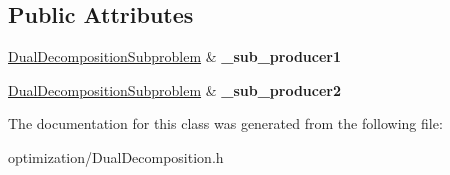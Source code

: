 \subsection*{Public Attributes}
\begin{DoxyCompactItemize}
\item 
\hypertarget{class_dual_decomposition_runner_a13371fbf1e5109e8a9d920d2ed0b7bea}{
\hyperlink{class_dual_decomposition_subproblem}{DualDecompositionSubproblem} \& {\bfseries \_\-sub\_\-producer1}}
\label{class_dual_decomposition_runner_a13371fbf1e5109e8a9d920d2ed0b7bea}

\item 
\hypertarget{class_dual_decomposition_runner_a988b68df84c131bc47d142ae8638fbd1}{
\hyperlink{class_dual_decomposition_subproblem}{DualDecompositionSubproblem} \& {\bfseries \_\-sub\_\-producer2}}
\label{class_dual_decomposition_runner_a988b68df84c131bc47d142ae8638fbd1}

\end{DoxyCompactItemize}


The documentation for this class was generated from the following file:\begin{DoxyCompactItemize}
\item 
optimization/DualDecomposition.h\end{DoxyCompactItemize}
